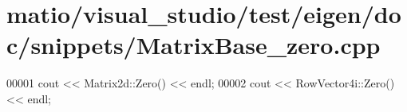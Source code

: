 \hypertarget{matio_2visual__studio_2test_2eigen_2doc_2snippets_2_matrix_base__zero_8cpp_source}{}\section{matio/visual\+\_\+studio/test/eigen/doc/snippets/\+Matrix\+Base\+\_\+zero.cpp}
\label{matio_2visual__studio_2test_2eigen_2doc_2snippets_2_matrix_base__zero_8cpp_source}

\begin{DoxyCode}
00001 cout << Matrix2d::Zero() << endl;
00002 cout << RowVector4i::Zero() << endl;
\end{DoxyCode}
